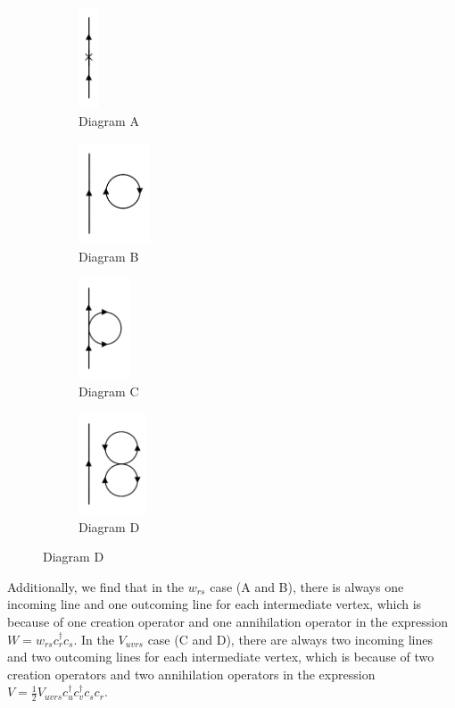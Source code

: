 \begin{figure}[ht]
	\centering
	\begin{subfigure}{0.2\textwidth}
		\centering
		\includegraphics[height=3cm]{figures/diagramA.png}
		\caption{Diagram A}
	\end{subfigure}
	\begin{subfigure}{0.2\textwidth}
		\centering
		\includegraphics[height=3cm]{figures/diagramB.png}
		\caption{Diagram B}
	\end{subfigure}
	\begin{subfigure}{0.2\textwidth}
		\centering
		\includegraphics[height=3cm]{figures/diagramC.png}
		\caption{Diagram C}
	\end{subfigure}
	\begin{subfigure}{0.2\textwidth}
		\centering
		\includegraphics[height=3cm]{figures/diagramD.png}
		\caption{Diagram D}
	\end{subfigure}
\end{figure}

Additionally, we find that in the $w_{rs}$ case (A and B), there is always one incoming line and one outcoming line for each intermediate vertex, which is because of one creation operator and one annihilation operator in the expression $W=w_{rs} c_r^{\dagger} c_s$.
In the $V_{uvrs}$ case (C and D), there are always two incoming lines and two outcoming lines for each intermediate vertex, which is because of two creation operators and two annihilation operators in the expression $V=\frac{1}{2}V_{uvrs} c_u^{\dagger} c_v^{\dagger} c_s c_r$.

